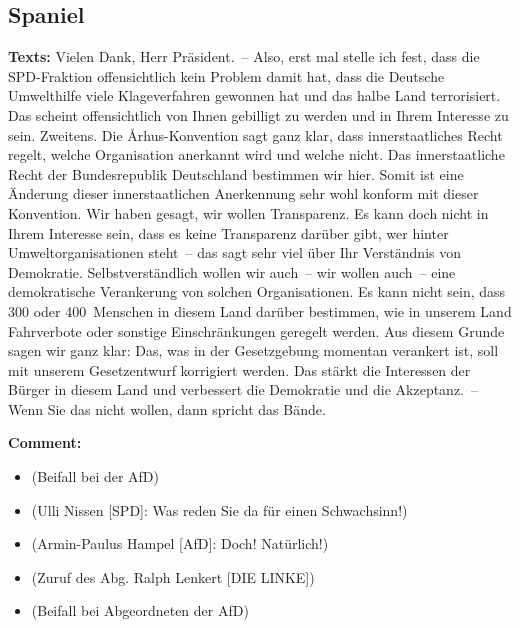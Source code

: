 \documentclass{article}
\begin{document}
\subsection{Spaniel}
\noindent\textbf{Texts:} Vielen Dank, Herr Präsident. – Also, erst mal stelle ich fest, dass die SPD-Fraktion offensichtlich kein Problem damit hat, dass die Deutsche Umwelthilfe viele Klageverfahren gewonnen hat  und das halbe Land terrorisiert.  Das scheint offensichtlich von Ihnen gebilligt zu werden und in Ihrem Interesse zu sein.  Zweitens. Die Århus-Konvention sagt ganz klar, dass innerstaatliches Recht regelt, welche Organisation anerkannt wird und welche nicht. Das innerstaatliche Recht der Bundesrepublik Deutschland bestimmen wir hier. Somit ist eine Änderung dieser innerstaatlichen Anerkennung sehr wohl konform mit dieser Konvention. Wir haben gesagt, wir wollen Transparenz. Es kann doch nicht in Ihrem Interesse sein, dass es keine Transparenz darüber gibt,  wer hinter Umweltorganisationen steht – das sagt sehr viel über Ihr Verständnis von Demokratie.  Selbstverständlich wollen wir auch – wir wollen auch – eine demokratische Verankerung von solchen Organisationen. Es kann nicht sein, dass 300 oder 400 Menschen in diesem Land darüber bestimmen, wie in unserem Land Fahrverbote oder sonstige Einschränkungen geregelt werden. Aus diesem Grunde sagen wir ganz klar: Das, was in der Gesetzgebung momentan verankert ist, soll mit unserem Gesetzentwurf korrigiert werden. Das stärkt die Interessen der Bürger in diesem Land und verbessert die Demokratie und die Akzeptanz. – Wenn Sie das nicht wollen, dann spricht das Bände. 

\noindent\textbf{Comment:}
\begin{itemize}
    \setlength\itemsep{-3pt}
    \item (Beifall bei der AfD)
    \setlength\itemsep{-3pt}
    \item (Ulli Nissen [SPD]: Was reden Sie da für einen Schwachsinn!)
    \setlength\itemsep{-3pt}
    \item (Armin-Paulus Hampel [AfD]: Doch! Natürlich!)
    \setlength\itemsep{-3pt}
    \item (Zuruf des Abg. Ralph Lenkert [DIE LINKE])
    \setlength\itemsep{-3pt}
    \item (Beifall bei Abgeordneten der AfD)
\end{itemize}
\end{document}
